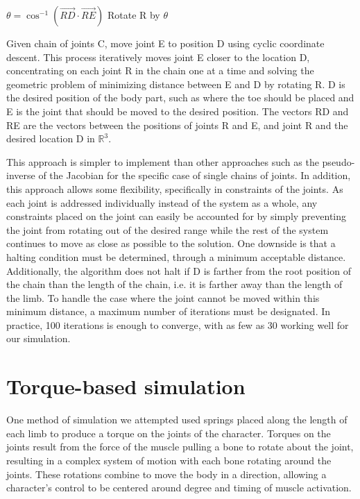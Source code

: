 \begin{algorithm}[ht]
	\centering
	\begin{algorithmic}[H]
		\Repeat
			\State $\theta = \cos^{-1} \left(\vec{RD} \cdot \vec{RE}\right)$
			\State Rotate R by $\theta$
		\EndFor
		\EndFunction
	\end{algorithmic}
	\caption[Single chain IK algorithm]{Given chain of joints C, move joint E to position D using cyclic coordinate descent.  This process iteratively moves joint E closer to the location D, concentrating on each joint R in the chain one at a time and solving the geometric problem of minimizing distance between E and D by rotating R.  D is the desired position of the body part, such as where the toe should be placed and E is the joint that should be moved to the desired position.  The vectors RD and RE are the vectors between the positions of joints R and E, and joint R and the desired location D in $\mathbb{R}^3$.}
	\label{alg:ik}
\end{algorithm}


This approach is simpler to implement than other approaches such as the pseudo-inverse of the Jacobian for the specific case of single chains of joints.  In addition, this approach allows some flexibility, specifically in constraints of the joints.  As each joint is addressed individually instead of the system as a whole, any constraints placed on the joint can easily be accounted for by simply preventing the joint from rotating out of the desired range while the rest of the system continues to move as close as possible to the solution.  One downside is that a halting condition must be determined, through a minimum acceptable distance.  Additionally, the algorithm does not halt if D is farther from the root position of the chain than the length of the chain, i.e. it is farther away than the length of the limb.  To handle the case where the joint cannot be moved within this minimum distance, a maximum number of iterations must be designated.  In practice, 100 iterations is enough to converge, with as few as 30 working well for our simulation.

\section{Torque-based simulation}
\label{section:torque}
One method of simulation we attempted used springs placed along the length of each limb to produce a torque on the joints of the character.  Torques on the joints result from the force of the muscle pulling a bone to rotate about the joint, resulting in a complex system of motion with each bone rotating around the joints.  These rotations combine to move the body in a direction, allowing a character's control to be centered around degree and timing of muscle activation. 

